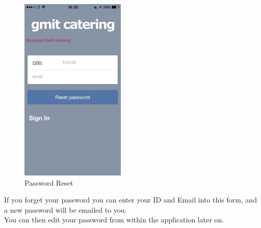 \begin{minipage}{5cm}
	\begin{figure}[H]
		\includegraphics[width=5cm]{img/mobile-app/screen-shots/IMG_2905.jpg}
		\caption{Password Reset}
	\end{figure}
\end{minipage} \hfill
\begin{minipage}{0.55\textwidth}
If you forget your password you can enter your ID and Email into this form, and a new password will be emailed to you.
\\

You can then edit your password from within the application later on.
\end{minipage}

